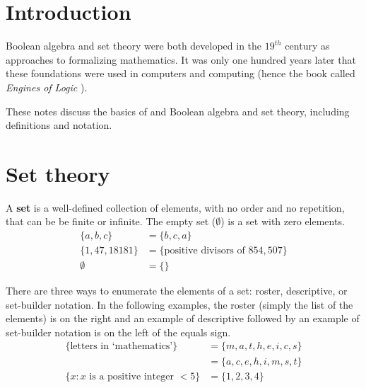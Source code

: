 \documentclass[11pt]{article}%
\begin{document}
\setlength{\baselineskip}{1.1\baselineskip}%


\begin{multicols}{2}

\section{Introduction}
\label{Introduction}

Boolean algebra and set theory were both developed in the $19^{th}$ century as approaches to formalizing mathematics. It was only one hundred years later that these foundations were used in computers and computing (hence the book called \textit{Engines of Logic} \parencite{book:engines-of-logic}).

These notes discuss the basics of and Boolean algebra and set theory, including definitions and notation.

\section{Set theory}
\label{Set}

A \textbf{set} is a well-defined collection of elements, with no order and no repetition, that can be be finite or infinite. The empty set ($\emptyset$) is a set with zero elements.
\begin{align*}
 \{a, b, c\} &= \{b, c, a\}\\
 \{1, 47, 18181\} &= \{\text{positive divisors of } 854,507\}\\
 \emptyset &= \{\}
\end{align*}

There are three ways to enumerate the elements of a set: roster, descriptive, or set-builder notation. In the following examples, the roster (simply the list of the elements) is on the right and an example of descriptive followed by an example of set-builder notation is on the left of the equals sign. \begin{align*}
 \{\text{letters in `mathematics'}\} &= \{m, a, t, h, e, i, c, s\}\\
 &= \{a, c, e, h, i, m, s, t\}\\
 \{x : x\text{ is a positive integer }<5\} &= \{1, 2, 3, 4\}
\end{align*}


\end{multicols}
\end{document}
